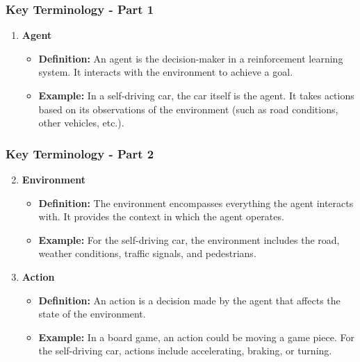 \documentclass[aspectratio=169]{beamer}
\begin{document}
\begin{frame}[fragile]
    \frametitle{Key Terminology - Part 1}
    \begin{enumerate}
        \item \textbf{Agent}
            \begin{itemize}
                \item \textbf{Definition:} An agent is the decision-maker in a reinforcement learning system. It interacts with the environment to achieve a goal.
                \item \textbf{Example:} In a self-driving car, the car itself is the agent. It takes actions based on its observations of the environment (such as road conditions, other vehicles, etc.).
            \end{itemize}
    \end{enumerate}
\end{frame}

\begin{frame}[fragile]
    \frametitle{Key Terminology - Part 2}
    \begin{enumerate}
        \setcounter{enumi}{1} %
        \item \textbf{Environment}
            \begin{itemize}
                \item \textbf{Definition:} The environment encompasses everything the agent interacts with. It provides the context in which the agent operates.
                \item \textbf{Example:} For the self-driving car, the environment includes the road, weather conditions, traffic signals, and pedestrians.
            \end{itemize}
        
        \item \textbf{Action}
            \begin{itemize}
                \item \textbf{Definition:} An action is a decision made by the agent that affects the state of the environment.
                \item \textbf{Example:} In a board game, an action could be moving a game piece. For the self-driving car, actions include accelerating, braking, or turning.
            \end{itemize}
    \end{enumerate}
\end{frame}
\end{document}
